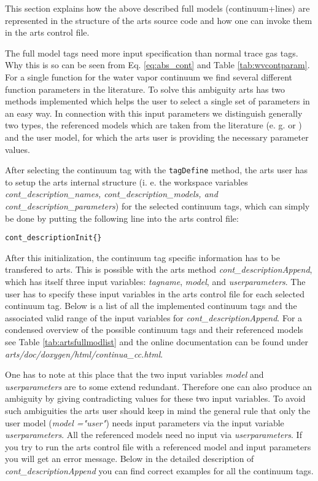 \label{levelc:ArtsImplementationCompleteModels}

This section explains how the above described full models (continuum+lines) 
are represented in the structure of the arts source code and how 
one can invoke them in the arts control file.

The full model tags need more input specification than normal trace gas
tags. Why this is so can be seen from Eq. \ref{eq:abs_cont} and 
Table \ref{tab:wvcontparam}. For a single function for the water vapor 
continuum we find several different function parameters in the literature. 
To solve this ambiguity arts has two methods implemented which helps 
the user to select a single set of parameters in an easy way. 
In connection with this input parameters we distinguish generally two 
types, the referenced models which are taken from the literature 
(e. g. \cite{liebeetal:93} or \cite{pwr:93}) and the user model, 
for which the arts user is providing the necessary parameter values.

After selecting the continuum tag with the {\tt tagDefine} method, 
the arts user has to setup the arts internal structure (i. e. the workspace 
variables {\it cont\_description\_names, cont\_description\_models, 
and cont\_description\_parameters}) for the selected continuum tags, 
which can simply be done by putting the following line into the arts control file:
\begin{verbatim}
cont_descriptionInit{}
\end{verbatim}

After this initialization, the continuum tag specific
information has to be transfered to arts. This is possible with the 
arts method {\it cont\_descriptionAppend}, which has itself 
three input variables: {\it tagname}, {\it model}, and 
{\it userparameters}. The user has to specify these input 
variables in the arts control file for each selected continuum tag. 
Below is a list of all the implemented continuum tags and the associated
valid range of the input variables for {\it cont\_descriptionAppend}. 
For a condensed overview of the possible continuum tags and their 
referenced models see Table \ref{tab:artsfullmodlist} and the 
online documentation can be found under 
{\it arts/doc/doxygen/html/continua\_cc.html}.

One has to note at this place that the two input variables {\it model} and
{\it userparameters} are to some extend redundant. Therefore one can also 
produce an ambiguity by giving contradicting values for these two input variables.
To avoid such ambiguities the arts user should keep in mind the general 
rule that only the user model ({\it model ="user"}) needs input parameters 
via the input variable {\it userparameters}. All the referenced models 
need no input via {\it userparameters}. If you try to run the arts control 
file with a referenced model and input parameters you will get an error message.
Below in the detailed description of {\it cont\_descriptionAppend} you 
can find correct examples for all the continuum tags.

